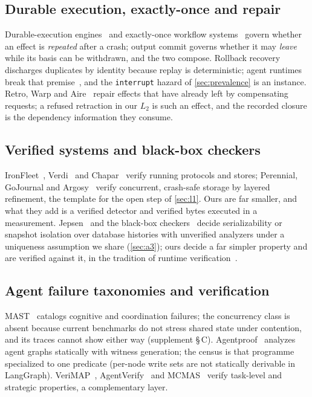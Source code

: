 \subsection{Durable execution, exactly-once and repair}
Durable-execution engines~\cite{TemporalIO,BurckhardtEtAl2021Durable} and
exactly-once workflow
systems~\cite{SkiadopoulosEtAl2022DBOS,ZhangEtAl2020Beldi,JiaWitchel2021Boki,QiEtAl2023Halfmoon}
govern whether an effect is \emph{repeated} after a crash; output commit
governs whether it may \emph{leave} while its basis can be withdrawn, and the
two compose. Rollback
recovery~\cite{StromYemini1985Optimistic,ElnozahyEtAl2002Rollback}
discharges duplicates by identity because replay is deterministic; agent
runtimes break that premise~\cite{ZhengEtAl2026ACRFence}, and the
\texttt{interrupt} hazard of \cref{sec:prevalence} is an instance. Retro,
Warp and Aire~\cite{KimEtAl2010Retro,ChandraEtAl2011Warp,ChandraEtAl2013Aire}
repair effects that have already left by compensating requests; a refused
retraction in our $L_2$ is such an effect, and the recorded closure is the
dependency information they consume.

\subsection{Verified systems and black-box checkers}
IronFleet~\cite{HawblitzelEtAl2015IronFleet}, Verdi~\cite{WilcoxEtAl2015Verdi}
and Chapar~\cite{LesaniBellChlipala2016Chapar} verify running protocols and
stores; Perennial, GoJournal and
Argosy~\cite{ChajedEtAl2019Perennial,ChajedEtAl2021GoJournal,ChajedEtAl2019Argosy}
verify concurrent, crash-safe storage by layered refinement, the template
for the open step of \cref{sec:l1}. Ours are far smaller, and what they add is a verified detector and
verified bytes executed in a measurement.
Jepsen~\cite{Kingsbury2013Jepsen} and the black-box
checkers~\cite{TanEtAl2020Cobra,Aphyr2020Elle,HuangEtAl2023PolySI,ZhangEtAl2023Viper,LiuEtAl2024Plume,ClarkEtAl2024Emme}
decide serializability or snapshot isolation over database histories with
unverified analyzers under a uniqueness assumption we share (\cref{sec:a3});
ours decide a far simpler property and are verified against it, in the
tradition of runtime
verification~\cite{HavelundRosu2002,LeuckerSchallhart2009,BauerLeuckerSchallhart2011}.

\subsection{Agent failure taxonomies and verification}
MAST~\cite{CemriEtAl2025MAST} catalogs cognitive and coordination failures;
the concurrency class is absent because current benchmarks do not stress
shared state under contention, and its traces cannot show  either way
(supplement \S\,C). Agentproof~\cite{XavierEtAl2026Agentproof} analyzes
agent graphs statically with witness generation; the census is that
programme specialized to one predicate (per-node write sets are not
statically derivable in LangGraph).
VeriMAP~\cite{Xu2025VeriMAP}, AgentVerify~\cite{AgentVerify2026} and
MCMAS~\cite{LomuscioQuRaimondi2017MCMAS} verify task-level and strategic
properties, a complementary layer.
